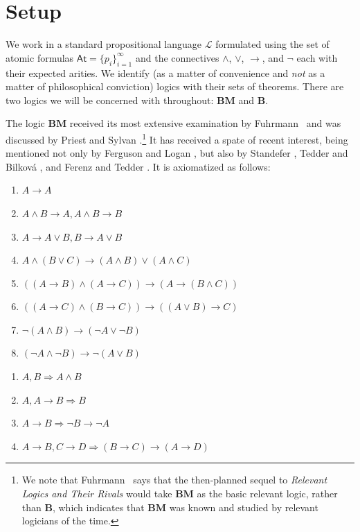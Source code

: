 \documentclass{amsart}
\theoremstyle{definition}
\newcommand{\LL}{\mathcal{L}}
\newcommand{\At}{\mathsf{At}}
\begin{document}
\section{Setup}

We work in a standard propositional language $\LL$ formulated using the set of atomic formulas $\At=\{p_i\}_{i=1}^\infty$ and the connectives $\land$, $\lor$, $\to$, and $\neg$ each with their expected arities. We identify (as a matter of convenience and \textit{not} as a matter of philosophical conviction) logics with their sets of theorems. There are two logics we will be concerned with throughout: $\mathbf{BM}$ and $\mathbf{B}$.

The logic $\mathbf{BM}$  received its most extensive examination by Fuhrmann~\citeyearpar{fuhrmann1988} and was discussed by 
Priest and Sylvan \citeyearpar{priest1992a}.\footnote{We note that Fuhrmann~\citeyearpar[27]{fuhrmann1988} says that the then-planned sequel to \emph{Relevant Logics and Their Rivals} would take $\mathbf{BM}$ as the basic relevant logic, rather than $\mathbf{B}$, which indicates that $\mathbf{BM}$ was known and studied by relevant logicians of the time.} 
It has received a spate of recent interest, being mentioned not only by Ferguson and Logan \citeyearpar{FergusonForthcoming-FERTTA-7}, but also by Standefer \citeyearpar{standefer2019tracking, standefer2023weak}, Tedder and Bilkov\'a \citeyearpar{tedder2022relevant}, and Ferenz and Tedder \citeyearpar{ferenz2023neighbourhood}. It is axiomatized as follows: 
\begin{enumerate}[({A}1)]
    \item $A\to A$
    \item $A\land B\to A,A\land B\to B$
    \item $A\to A\lor B, B\to A\lor B$
    \item $A\land(B\lor C)\to(A\land B)\lor(A\land C)$
    \item $((A\to B)\land(A\to C))\to(A\to(B\land C))$
    \item $((A\to C)\land(B\to C))\to((A\lor B)\to C)$
    \item $\neg(A\land B)\to(\neg A\lor\neg B)$
    \item $(\neg A\land\neg B)\to\neg(A\lor B)$
\end{enumerate}
\begin{enumerate}[({R}1)]    
    \item $A,B\Rightarrow A\land B$
    \item $A,A\to B\Rightarrow B$
    \item $A\to B\Rightarrow\neg B\to\neg A$
    \item $A\to B,C\to D\Rightarrow(B\to C)\to(A\to D)$
\end{enumerate}
\end{document}
